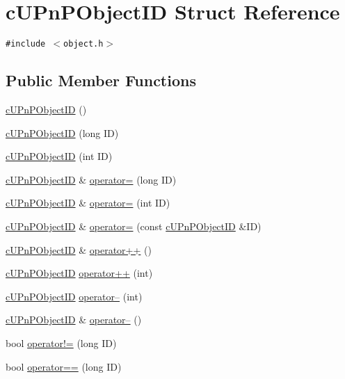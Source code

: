 \hypertarget{structcUPnPObjectID}{
\section{cUPnPObjectID Struct Reference}
\label{structcUPnPObjectID}
}
{\tt \#include $<$object.h$>$}

\subsection*{Public Member Functions}
\begin{CompactItemize}
\item 
\hyperlink{structcUPnPObjectID_c2ee8d12b2b317fa430e9107f1870efe}{cUPnPObjectID} ()
\item 
\hyperlink{structcUPnPObjectID_baeac468c4117f2fac4e3d93f3de9730}{cUPnPObjectID} (long ID)
\item 
\hyperlink{structcUPnPObjectID_f3e044892ae1c1d840d4154ab96a2440}{cUPnPObjectID} (int ID)
\item 
\hyperlink{structcUPnPObjectID}{cUPnPObjectID} \& \hyperlink{structcUPnPObjectID_747dfcfad52baae471cc756bed63a6e8}{operator=} (long ID)
\item 
\hyperlink{structcUPnPObjectID}{cUPnPObjectID} \& \hyperlink{structcUPnPObjectID_b83af995ac5e03b6f6402d83a6713960}{operator=} (int ID)
\item 
\hyperlink{structcUPnPObjectID}{cUPnPObjectID} \& \hyperlink{structcUPnPObjectID_9d2adc7bcee2e5b1d51aa7ffc385296f}{operator=} (const \hyperlink{structcUPnPObjectID}{cUPnPObjectID} \&ID)
\item 
\hyperlink{structcUPnPObjectID}{cUPnPObjectID} \& \hyperlink{structcUPnPObjectID_c347bd50efed28fda02f98da46114786}{operator++} ()
\item 
\hyperlink{structcUPnPObjectID}{cUPnPObjectID} \hyperlink{structcUPnPObjectID_d46000a3acdd6f522bf3b86e48d47ddf}{operator++} (int)
\item 
\hyperlink{structcUPnPObjectID}{cUPnPObjectID} \hyperlink{structcUPnPObjectID_3e6872234bfd011a720b7847190dfdb9}{operator--} (int)
\item 
\hyperlink{structcUPnPObjectID}{cUPnPObjectID} \& \hyperlink{structcUPnPObjectID_40864616e14e4b5c98ff274098402be7}{operator--} ()
\item 
bool \hyperlink{structcUPnPObjectID_25b1f5cd4eb080cc4ab53731e1bd75f1}{operator!=} (long ID)
\item 
bool \hyperlink{structcUPnPObjectID_b612ccd98af29996a4ac15cdbf01320f}{operator==} (long ID)

\end{CompactItemize}
